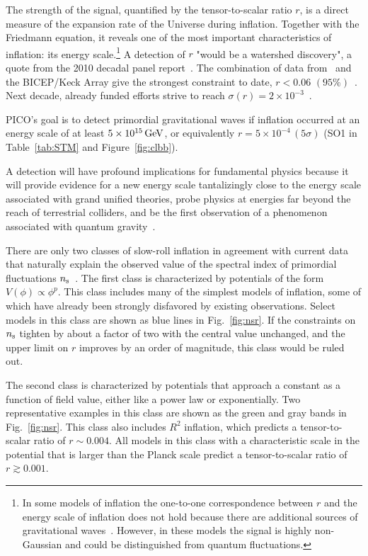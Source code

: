 \documentclass[PICOReport.tex]{subfiles}
\begin{document}
The strength of the signal, quantified by the tensor-to-scalar ratio $r$, is a direct measure of the expansion rate of the Universe during inflation. Together with the Friedmann equation, it reveals one of the most important characteristics of inflation: its energy scale.\footnote{In some models of inflation the one-to-one correspondence between $r$ and the energy scale of inflation does not hold because there are additional sources of gravitational waves~\cite{Namba:2015gja}. However, in these models the signal is highly non-Gaussian and could be distinguished from quantum fluctuations.}  A detection of $r$  "would be a watershed discovery", a quote from the 2010 decadal panel report~\citep{blandford2010}. The combination of data from \planck\ and the BICEP/Keck Array give the strongest constraint to date, $r<0.06\,\, (95\%)$~\citep{2018arXiv181005216A}. Next decade, already funded efforts strive to reach $\sigma(r)=2\times10^{-3}$~\citep{SOscience, BKA}.

PICO's goal is to detect primordial gravitational waves if inflation occurred at an energy scale of at least $5\times 10^{15}\,\rm{GeV}$, or equivalently $r= 5\times 10^{-4} \, (5\sigma)$ (SO1 in Table~\ref{tab:STM} and Figure~\ref{fig:clbb}). 

A detection will have profound implications for fundamental physics because it will provide evidence for a new energy scale tantalizingly close to the energy scale associated with grand unified theories, probe physics at energies far beyond the reach of terrestrial colliders, and be the first observation of a phenomenon associated with quantum gravity~\cite{Krauss:2013pha}.

There are only two classes of slow-roll inflation in agreement with current data that naturally explain the observed value of the spectral index of primordial fluctuations $n_{\rm s}$~\cite{Aghanim:2018eyx}. The first class is characterized by potentials of the form $V(\phi)\propto\phi^p$. This class includes many of the simplest models of inflation, some of which have already been strongly disfavored by existing observations. Select models in this class are shown as blue lines in Fig.~\ref{fig:nsr}. If the constraints on $n_{\rm s}$ tighten by about a factor of two with the central value unchanged, and the upper limit on $r$ improves by an order of magnitude, this class would be ruled out. 

The second class is characterized by potentials that approach a constant as a function of field value, either like a power law or exponentially. Two representative examples in this class are shown as the green and gray bands in Fig.~\ref{fig:nsr}. This class also includes $R^2$ inflation, which predicts a tensor-to-scalar ratio of $r\sim 0.004$. All models in this class with a characteristic scale in the potential that is larger than the Planck scale predict a tensor-to-scalar ratio of $r\gtrsim 0.001$. 
\end{document}
